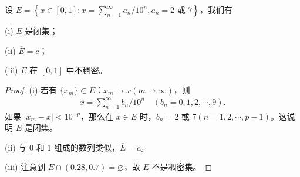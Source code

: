 \documentclass[../../main.tex]{subfiles}
\begin{document}
\begin{example}
设 \(E = \left\{x\in[0,1]: x = \sum_{n = 1}^{\infty}a_n/10^n, a_n = 2 \text{ 或 } 7\right\}\)，我们有

(i) \(E\) 是闭集； 

(ii) \(\overline{E}=c\)； 

(iii) \(E\) 在 \([0,1]\) 中不稠密。
\end{example}
\begin{proof}
(i) 若有 \(\{x_m\}\subset E\)：\(x_m\rightarrow x (m\rightarrow\infty)\)，则
\begin{align*}
x = \sum_{n = 1}^{\infty}b_n/10^n \quad (b_n = 0,1,2,\cdots,9).
\end{align*}
如果 \(|x_m - x|<10^{-p}\)，那么在 \(x\in E\) 时，\(b_n = 2 \text{ 或 } 7 (n = 1,2,\cdots,p - 1)\)。这说明 \(E\) 是闭集。

(ii) 与 \(0\) 和 \(1\) 组成的数列类似，\(\overline{E}=c\)。

(iii) 注意到 \(E\cap(0.28,0.7)=\varnothing\)，故 \(E\) 不是稠密集。 

\end{proof}
\end{document}
